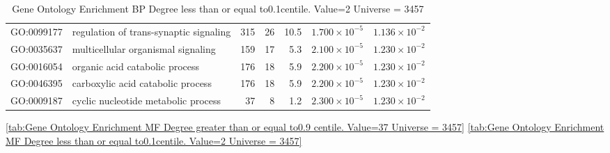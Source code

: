 \begin{table}[ht]
\begin{adjustbox}{max width=\textwidth}
\begin{tabular}{llrrrrr}
  GO:0099177 & regulation of trans-synaptic signaling & 315 & 26 & 10.5 & $1.700 \times 10^{-5}$ & $1.136 \times 10^{-2}$ \\ 
  GO:0035637 & multicellular organismal signaling & 159 & 17 & 5.3 & $2.100 \times 10^{-5}$ & $1.230 \times 10^{-2}$ \\ 
  GO:0016054 & organic acid catabolic process & 176 & 18 & 5.9 & $2.200 \times 10^{-5}$ & $1.230 \times 10^{-2}$ \\ 
  GO:0046395 & carboxylic acid catabolic process & 176 & 18 & 5.9 & $2.200 \times 10^{-5}$ & $1.230 \times 10^{-2}$ \\ 
  GO:0009187 & cyclic nucleotide metabolic process & 37 & 8 & 1.2 & $2.300 \times 10^{-5}$ & $1.230 \times 10^{-2}$ \\ 
   \hline
\end{tabular}
\end{adjustbox}
\caption{Gene Ontology Enrichment BP Degree  less than or equal to0.1centile.   Value=2 Universe = 3457} 
\label{tab:Gene Ontology Enrichment BP Degree  less than or equal to0.1centile.   Value=2 Universe = 3457}
\end{table}
\ref{tab:Gene Ontology Enrichment MF Degree  greater than or equal to0.9 centile.   Value=37 Universe = 3457}
\ref{tab:Gene Ontology Enrichment MF Degree  less than or equal to0.1centile.   Value=2 Universe = 3457}
